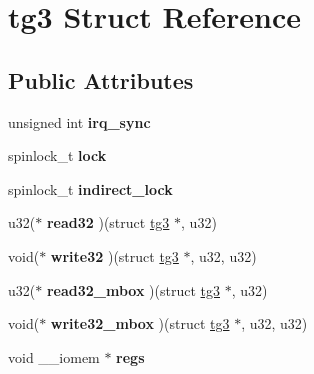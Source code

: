 \hypertarget{structtg3}{
\section{tg3 Struct Reference}
\label{structtg3}
}
\subsection*{Public Attributes}
\begin{DoxyCompactItemize}
\item 
\hypertarget{structtg3_a5601848f3b7f51b1ef14f9b650b27ea8}{
unsigned int {\bfseries irq\_\-sync}}
\label{structtg3_a5601848f3b7f51b1ef14f9b650b27ea8}

\item 
\hypertarget{structtg3_a6f3f554973e61f85651f36ab96354699}{
spinlock\_\-t {\bfseries lock}}
\label{structtg3_a6f3f554973e61f85651f36ab96354699}

\item 
\hypertarget{structtg3_a8d28e9dfaa639e54f774a732ca280342}{
spinlock\_\-t {\bfseries indirect\_\-lock}}
\label{structtg3_a8d28e9dfaa639e54f774a732ca280342}

\item 
\hypertarget{structtg3_a37dd145067db43ce2f11b53f6b7e792f}{
u32($\ast$ {\bfseries read32} )(struct \hyperlink{structtg3}{tg3} $\ast$, u32)}
\label{structtg3_a37dd145067db43ce2f11b53f6b7e792f}

\item 
\hypertarget{structtg3_a87291abfaa8dfd0e2cb25c9b0f850a36}{
void($\ast$ {\bfseries write32} )(struct \hyperlink{structtg3}{tg3} $\ast$, u32, u32)}
\label{structtg3_a87291abfaa8dfd0e2cb25c9b0f850a36}

\item 
\hypertarget{structtg3_a093baddb6d455700d0b82964c9cd1754}{
u32($\ast$ {\bfseries read32\_\-mbox} )(struct \hyperlink{structtg3}{tg3} $\ast$, u32)}
\label{structtg3_a093baddb6d455700d0b82964c9cd1754}

\item 
\hypertarget{structtg3_a017899eb82d064242a02ae81b9daec97}{
void($\ast$ {\bfseries write32\_\-mbox} )(struct \hyperlink{structtg3}{tg3} $\ast$, u32, u32)}
\label{structtg3_a017899eb82d064242a02ae81b9daec97}

\item 
\hypertarget{structtg3_a18f4a1974a62420026eddd5a40c8f97f}{
void \_\-\_\-iomem $\ast$ {\bfseries regs}}
\label{structtg3_a18f4a1974a62420026eddd5a40c8f97f}


\end{DoxyCompactItemize}
